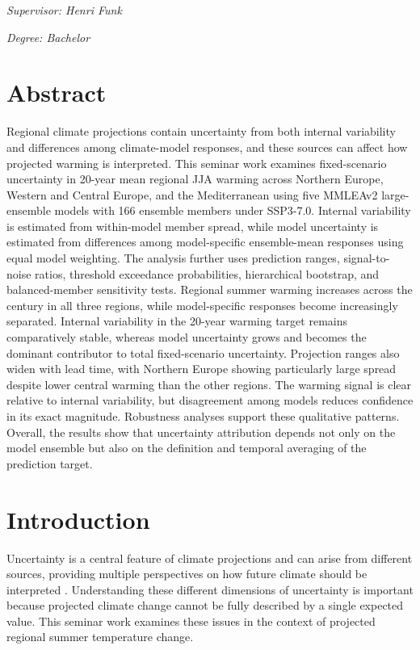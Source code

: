 \documentclass[
]{krantz}
\begin{document}
\emph{Supervisor: Henri Funk}

\emph{Degree: Bachelor}

\section{Abstract}\label{abstract-3}

Regional climate projections contain uncertainty from both internal variability and differences among climate-model responses, and these sources can affect how projected warming is interpreted. This seminar work examines fixed-scenario uncertainty in 20-year mean regional JJA warming across Northern Europe, Western and Central Europe, and the Mediterranean using five MMLEAv2 large-ensemble models with 166 ensemble members under SSP3-7.0. Internal variability is estimated from within-model member spread, while model uncertainty is estimated from differences among model-specific ensemble-mean responses using equal model weighting. The analysis further uses prediction ranges, signal-to-noise ratios, threshold exceedance probabilities, hierarchical bootstrap, and balanced-member sensitivity tests. Regional summer warming increases across the century in all three regions, while model-specific responses become increasingly separated. Internal variability in the 20-year warming target remains comparatively stable, whereas model uncertainty grows and becomes the dominant contributor to total fixed-scenario uncertainty. Projection ranges also widen with lead time, with Northern Europe showing particularly large spread despite lower central warming than the other regions. The warming signal is clear relative to internal variability, but disagreement among models reduces confidence in its exact magnitude. Robustness analyses support these qualitative patterns. Overall, the results show that uncertainty attribution depends not only on the model ensemble but also on the definition and temporal averaging of the prediction target.

\section{Introduction}\label{introduction-5}

Uncertainty is a central feature of climate projections and can arise from different sources, providing multiple perspectives on how future climate should be interpreted \citep{Hawkins2009}. Understanding these different dimensions of uncertainty is important because projected climate change cannot be fully described by a single expected value. This seminar work examines these issues in the context of projected regional summer temperature change.
\end{document}
